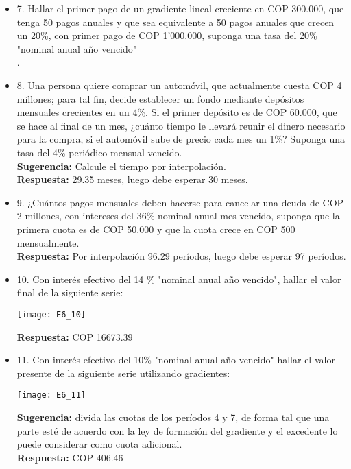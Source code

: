 \begin{itemize}
 \item 7. Hallar el primer pago de un gradiente lineal creciente en COP 300.000, que tenga 50 pagos anuales y que sea equivalente a 50 pagos anuales que crecen un 20\%, con primer pago de COP 1'000.000, suponga una tasa del 20\% "nominal anual año vencido"\\.
       \medskip

 \item 8. Una persona quiere comprar un automóvil, que actualmente cuesta COP 4 millones; para tal fin, decide establecer un fondo mediante depósitos mensuales crecientes en un 4\%. Si el primer depósito es de COP 60.000, que se hace al final de un mes, ¿cuánto tiempo le llevará reunir el dinero necesario para la compra, si el automóvil sube de precio cada mes un 1\%? Suponga una tasa del 4\% periódico mensual vencido.\\
       \textbf{Sugerencia:} Calcule el tiempo por interpolación.\\
       \textbf{Respuesta:} 29.35 meses, luego debe esperar 30 meses.\\
       \medskip

 \item 9. ¿Cuántos pagos mensuales deben hacerse para cancelar una deuda de COP 2 millones, con intereses del 36\% nominal anual mes vencido, suponga que la primera cuota es de COP 50.000 y que la cuota crece en COP 500 mensualmente.\\
       \textbf{Respuesta:} Por interpolación 96.29 períodos, luego debe esperar 97 períodos.\\
       \medskip

 \item 10. Con interés efectivo del 14 \% "nominal anual año vencido", hallar el valor final de la siguiente serie:\\
       \begin{center}
        \texttt{[image: E6\_10]}
       \end{center}
       \textbf{Respuesta:} COP 16673.39\\
       \medskip

 \item 11. Con interés efectivo del 10\% "nominal anual año vencido" hallar el valor presente de la siguiente serie utilizando gradientes:
       \begin{center}
        \texttt{[image: E6\_11]}
       \end{center}
       \textbf{Sugerencia:} divida las cuotas de los períodos 4 y 7, de forma tal que una parte esté de acuerdo con la ley de formación del gradiente y el excedente lo puede considerar como cuota adicional.\\
       \textbf{Respuesta:} COP 406.46\
       \medskip


\end{itemize}
